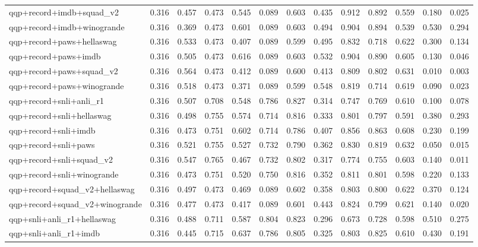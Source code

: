 \begin{table}[t]
\begin{tabular}{lrrrrrrrrrrrr}
    qqp+record+imdb+squad\_v2 & 0.316 & 0.457 & 0.473 & 0.545 & 0.089 & 0.603 & 0.435 & 0.912 & 0.892 & 0.559 & 0.180 & 0.025 \\
    qqp+record+imdb+winogrande & 0.316 & 0.369 & 0.473 & 0.601 & 0.089 & 0.603 & 0.494 & 0.904 & 0.894 & 0.539 & 0.530 & 0.294 \\
    qqp+record+paws+hellaswag & 0.316 & 0.533 & 0.473 & 0.407 & 0.089 & 0.599 & 0.495 & 0.832 & 0.718 & 0.622 & 0.300 & 0.134 \\
    qqp+record+paws+imdb & 0.316 & 0.505 & 0.473 & 0.616 & 0.089 & 0.603 & 0.532 & 0.904 & 0.890 & 0.605 & 0.130 & 0.046 \\
    qqp+record+paws+squad\_v2 & 0.316 & 0.564 & 0.473 & 0.412 & 0.089 & 0.600 & 0.413 & 0.809 & 0.802 & 0.631 & 0.010 & 0.003 \\
    qqp+record+paws+winogrande & 0.316 & 0.518 & 0.473 & 0.371 & 0.089 & 0.599 & 0.548 & 0.819 & 0.714 & 0.619 & 0.090 & 0.023 \\
    qqp+record+snli+anli\_r1 & 0.316 & 0.507 & 0.708 & 0.548 & 0.786 & 0.827 & 0.314 & 0.747 & 0.769 & 0.610 & 0.100 & 0.078 \\
    qqp+record+snli+hellaswag & 0.316 & 0.498 & 0.755 & 0.574 & 0.714 & 0.816 & 0.333 & 0.801 & 0.797 & 0.591 & 0.380 & 0.293 \\
    qqp+record+snli+imdb & 0.316 & 0.473 & 0.751 & 0.602 & 0.714 & 0.786 & 0.407 & 0.856 & 0.863 & 0.608 & 0.230 & 0.199 \\
    qqp+record+snli+paws & 0.316 & 0.521 & 0.755 & 0.527 & 0.732 & 0.790 & 0.362 & 0.830 & 0.819 & 0.632 & 0.050 & 0.015 \\
    qqp+record+snli+squad\_v2 & 0.316 & 0.547 & 0.765 & 0.467 & 0.732 & 0.802 & 0.317 & 0.774 & 0.755 & 0.603 & 0.140 & 0.011 \\
    qqp+record+snli+winogrande & 0.316 & 0.473 & 0.751 & 0.520 & 0.750 & 0.816 & 0.352 & 0.811 & 0.801 & 0.598 & 0.220 & 0.133 \\
    qqp+record+squad\_v2+hellaswag & 0.316 & 0.497 & 0.473 & 0.469 & 0.089 & 0.602 & 0.358 & 0.803 & 0.800 & 0.622 & 0.370 & 0.124 \\
    qqp+record+squad\_v2+winogrande & 0.316 & 0.477 & 0.473 & 0.417 & 0.089 & 0.601 & 0.443 & 0.824 & 0.799 & 0.621 & 0.140 & 0.020 \\
    qqp+snli+anli\_r1+hellaswag & 0.316 & 0.488 & 0.711 & 0.587 & 0.804 & 0.823 & 0.296 & 0.673 & 0.728 & 0.598 & 0.510 & 0.275 \\
    qqp+snli+anli\_r1+imdb & 0.316 & 0.445 & 0.715 & 0.637 & 0.786 & 0.805 & 0.325 & 0.803 & 0.825 & 0.610 & 0.430 & 0.191 \\

\end{tabular}
\end{table}
